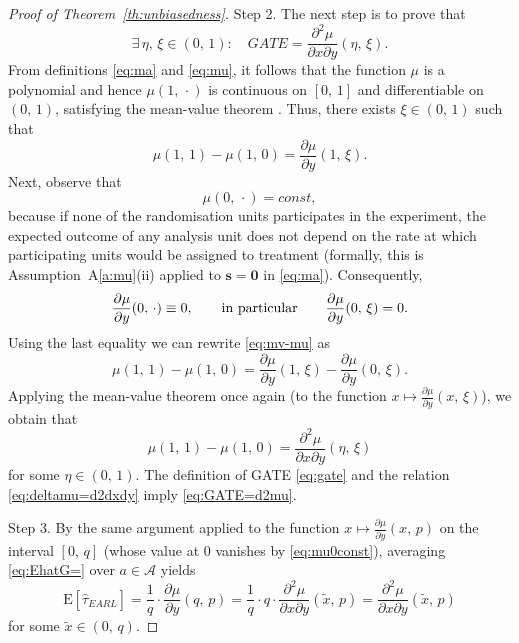 \documentclass[sigconf,nonacm]{acmart}
\newcommand{\E}{\mathrm E}
\begin{document}
\begin{proof}[Proof of Theorem~\ref{th:unbiasedness}]
Step 2. The next step is to prove that
\begin{equation}\label{eq:GATE=d2mu}
    \exists\,\eta,\,\xi\in(0,\,1)\colon\quad GATE = \frac{\partial^2\mu}{\partial x \partial y}(\eta,\,\xi).
\end{equation}
From definitions \eqref{eq:ma} and \eqref{eq:mu}, it follows that the function $\mu$ is a polynomial and hence $\mu(1,\,\cdot)$ is continuous on $[0,\,1]$ and differentiable on $(0,\,1)$, satisfying the mean-value theorem \cite[Theorem~5.10]{rudin1976principles}. Thus, there exists $\xi\in(0,\,1)$ such that
\begin{equation}\label{eq:mv-mu}
    \mu(1,\,1)-\mu(1,\,0) = \frac{\partial\mu}{\partial y}(1,\,\xi).
\end{equation}
Next, observe that
\begin{equation}\label{eq:mu0const}
    \mu(0,\,\cdot) = const,
\end{equation}
because if none of the randomisation units participates in the experiment, the expected outcome of any analysis unit does not depend on the rate at which participating units would be assigned to treatment (formally, this is Assumption~A\ref{a:mu}(ii) applied to $\mathbf s = \mathbf 0$ in \eqref{eq:ma}). Consequently,
\begin{equation*}
    \frac{\partial\mu}{\partial y}(0,\,\cdot) \equiv 0,\qquad\textup{in particular}\qquad
    \frac{\partial\mu}{\partial y}(0,\,\xi) = 0.
\end{equation*}
Using the last equality we can rewrite \eqref{eq:mv-mu} as
\begin{equation*}
    \mu(1,\,1)-\mu(1,\,0) = \frac{\partial\mu}{\partial y}(1,\,\xi) - \frac{\partial\mu}{\partial y}(0,\,\xi).
\end{equation*}
Applying the mean-value theorem once again (to the function $x\mapsto \frac{\partial\mu}{\partial y}(x,\,\xi)$), we obtain that
\begin{equation}\label{eq:deltamu=d2dxdy}
    \mu(1,\,1)-\mu(1,\,0) = \frac{\partial^2\mu}{\partial x\partial y}(\eta,\,\xi)
\end{equation}
for some $\eta\in(0,\,1)$. The definition of GATE \eqref{eq:gate} and the relation \eqref{eq:deltamu=d2dxdy} imply \eqref{eq:GATE=d2mu}.

Step 3. By the same argument applied to the function $x\mapsto\frac{\partial \mu}{\partial y}(x,\,p)$ on the interval $[0,\,q]$ (whose value at $0$ vanishes by \eqref{eq:mu0const}), averaging \eqref{eq:EhatG=} over $a\in\mathcal A$ yields
\begin{equation}\label{eq:EhatTau}
    \E[\hat\tau^{\phantom{1}}_{EARL}] = \frac 1q\cdot \frac{\partial\mu}{\partial y}(q,\,p) = \frac 1q \cdot q\cdot\frac{\partial^2\mu}{\partial x\partial y}(\tilde x,\,p) = \frac{\partial^2\mu}{\partial x\partial y}(\tilde x,\,p)
\end{equation}
for some $\tilde x\in(0,\,q)$.


\end{proof}
\end{document}
